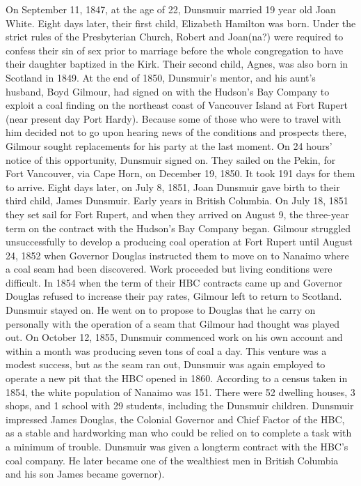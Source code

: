 {{On September 11, 1847, at the age of 22, Dunsmuir married 19 year old Joan White. Eight days later, their first child, Elizabeth Hamilton was born. Under the strict rules of the Presbyterian Church, Robert and Joan(na?) were required to confess their sin of sex prior to marriage before the whole congregation to have their daughter baptized in the Kirk. Their second child, Agnes, was also born in Scotland in 1849. At the end of 1850, Dunsmuir's mentor, and his aunt's husband, Boyd Gilmour, had signed on with the Hudson's Bay Company to exploit a coal finding on the northeast coast of Vancouver Island at Fort Rupert (near present day Port Hardy). Because some of those who were to travel with him decided not to go upon hearing news of the conditions and prospects there, Gilmour sought replacements for his party at the last moment. On 24 hours' notice of this opportunity, Dunsmuir signed on. They sailed on the Pekin, for Fort Vancouver, via Cape Horn, on December 19, 1850. It took 191 days for them to arrive. Eight days later, on July 8, 1851, Joan Dunsmuir gave birth to their third child, James Dunsmuir. Early years in British Columbia.  On July 18, 1851 they set sail for Fort Rupert, and when they arrived on August 9, the three-year term on the contract with the Hudson's Bay Company began. Gilmour struggled unsuccessfully to develop a producing coal operation at Fort Rupert until August 24, 1852 when Governor Douglas instructed them to move on to Nanaimo where a coal seam had been discovered. Work proceeded but living conditions were difficult. In 1854 when the term of their HBC contracts came up and Governor Douglas refused to increase their pay rates, Gilmour left to return to Scotland. Dunsmuir stayed on. He went on to propose to Douglas that he carry on personally with the operation of a seam that Gilmour had thought was played out. On October 12, 1855, Dunsmuir commenced work on his own account and within a month was producing seven tons of coal a day. This venture was a modest success, but as the seam ran out, Dunsmuir was again employed to operate a new pit that the HBC opened in 1860.
According to a census taken in 1854, the white population of Nanaimo was 151. There were 52 dwelling houses, 3 shops, and 1 school with 29 students, including the Dunsmuir children. Dunsmuir impressed James Douglas, the Colonial Governor and Chief Factor of the HBC, as a stable and hardworking man who could be relied on to complete a task with a minimum of trouble. Dunsmuir was given a longterm contract with the HBC’s coal company. He later became one of the wealthiest men in British Columbia and his son James became governor).

}}
